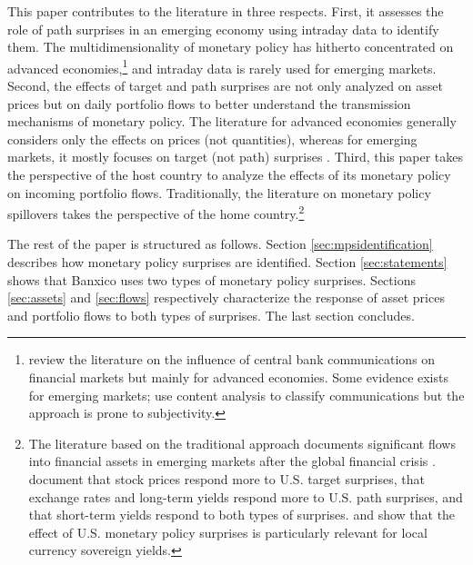 {This paper contributes to the literature in three respects. 
First, it assesses the role of path surprises in an emerging economy using intraday data to identify them. The multidimensionality of monetary policy has hitherto concentrated on advanced economies,\footnote{ \textcite{Blinderetal:2008} review the literature on the influence of central bank communications on financial markets but mainly for advanced economies. Some evidence exists for emerging markets; \textcite{SuAhmadWood:2019} use content analysis to classify communications but the approach is prone to subjectivity.} and intraday data is rarely used for emerging markets. 
Second, the effects of target and path surprises are not only analyzed on asset prices but on daily portfolio flows to better understand the transmission mechanisms of monetary policy. The literature for advanced economies generally considers only the effects on prices (not quantities), whereas for emerging markets, it mostly focuses on target (not path) surprises \parencite{Kohlscheen:2014,Solis:FX}. 
Third, this paper takes the perspective of the host country to analyze the effects of its monetary policy on incoming portfolio flows. Traditionally, the literature on monetary policy spillovers takes the perspective of the home country.\footnote{The literature based on the traditional approach documents significant flows into financial assets in emerging markets after the global financial crisis \parencite{FratzscherLoDucaStraub:2018}. \textcite{HausmanWongswan:2011} document that stock prices respond more to U.S. target surprises, that exchange rates and long-term yields respond more to U.S. path surprises, and that short-term yields respond to both types of surprises. \textcite{BowmanLondonoSapriza:2015} and \textcite{Fischer:2020} show that the effect of U.S. monetary policy surprises is particularly relevant for local currency sovereign yields.} 

The rest of the paper is structured as follows. 
Section \ref{sec:mpsidentification} describes how monetary policy surprises are identified. 
Section \ref{sec:statements} shows that Banxico uses two types of monetary policy surprises. Sections \ref{sec:assets} and \ref{sec:flows} respectively characterize the response of asset prices and portfolio flows to both types of surprises. The last section concludes.

}
